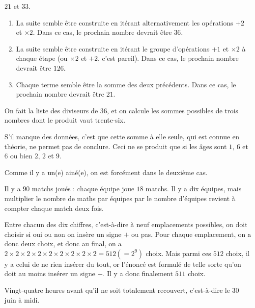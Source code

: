 \begin{Soln}{1}
$21$ et $33$.
\end{Soln}
\begin{Soln}{2}
\begin{enumerate}
\item La suite semble être construite en itérant alternativement les opérations $+2$ et $\times 2$. Dans ce cas, le prochain nombre devrait être $36$.
\item La suite semble être construite en itérant le groupe d'opérations $+1$ et $\times 2$ à chaque étape (ou $\times 2$ et $+2$, c'est pareil). Dans ce cas, le prochain nombre devrait être $126$.
\item
Chaque terme semble être la somme des deux précédents. Dans ce cas, le prochain nombre devrait être $21$.
\end{enumerate}
\end{Soln}
\begin{Soln}{3}
On fait la liste des diviseurs de $36$, et on calcule les sommes possibles de trois nombres dont le produit vaut trente-six.

S'il manque des données, c'est que cette somme à elle seule, qui est connue en théorie, ne permet pas de conclure. Ceci ne se produit que si les âges sont $1$, $6$ et $6$ ou bien $2$, $2$ et $9$.

Comme il y a un(e) ainé(e), on est forcément dans le deuxième cas.
\end{Soln}
\begin{Soln}{5}
Il y a $90$ matchs joués : chaque équipe joue $18$ matchs. Il y a dix équipes, mais multiplier le nombre de maths par équipes par le nombre d'équipes revient à compter chaque match deux fois.
\end{Soln}
\begin{Soln}{6}
Entre chacun des dix chiffres, c'est-à-dire à neuf emplacements possibles, on doit choisir si oui ou non on insère un signe $+$ ou pas. Pour chaque emplacement, on a donc deux choix, et donc au final, on a $2\times 2\times 2\times2\times2\times2\times2\times2\times 2 =512 (=2^9)$ choix. Mais parmi ces $512$ choix, il y a celui de ne rien insérer du tout, or l'énoncé est formulé de telle sorte qu'on doit au moins insérer un signe $+$. Il y a donc finalement $511$ choix.
\end{Soln}
\begin{Soln}{7}
Vingt-quatre heures avant qu'il ne soit totalement recouvert, c'est-à-dire le 30 juin à midi.
\end{Soln}
